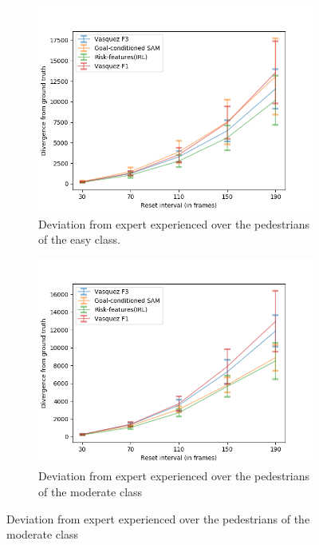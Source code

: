 \begin{figure}[htbp]
	\begin{subfigure}{0.5\textwidth}
		\centering
		\includegraphics[width=\linewidth]{plots/zara02_inter_irl_adjusted_speed/drift_easy_inter_irl_zara02_adjusted.png}
		\caption {Deviation from expert experienced over the pedestrians of the easy class.}
		\label{fig:inter_IRL-drift_analysis_easy-zara02}
	\end{subfigure}
	\begin{subfigure}{0.5\textwidth}
		\centering
     	\includegraphics[width=\linewidth]{plots/zara02_inter_irl_adjusted_speed/drift_med_inter_irl_zara02_adjusted.png}
		\caption {Deviation from expert experienced over the pedestrians of the moderate class}

\end{subfigure}
\end{figure}
